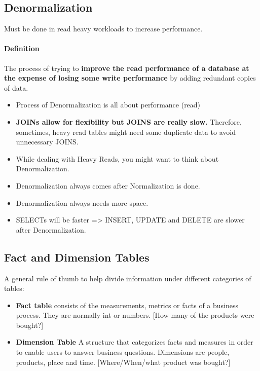\documentclass[
	paper=a4,%
	pagesize,%
	8pt, fleqn,%
	headings=small,%
	notitlepage,%
	parskip=never]%
	{scrreprt}
\begin{document}
\begin{multicols*}{3}
\section{Denormalization}
Must be done in read heavy workloads to increase performance.

\paragraph{Definition} The process of trying to \textbf{improve the read performance of a database at the expense of losing some write performance} by adding redundant copies of data. 

\begin{itemize}
\item Process of Denormalization is all about performance (read)
\item \textbf{JOINs allow for flexibility but JOINS are really slow.} Therefore, sometimes, heavy read tables might need some duplicate data to avoid unnecessary JOINS.
\item While dealing with Heavy Reads, you might want to think about Denormalization.
\item Denormalization always comes after Normalization is done.
\item Denormalization always needs more space.
\item SELECTs will be faster => INSERT, UPDATE and DELETE are slower after Denormalization.
\end{itemize}

\subsection{Fact and Dimension Tables}
A general rule of thumb to help divide information under different categories of tables:

\begin{itemize}
\item \textbf{Fact table} consists of the measurements, metrics or facts of a business process. They are normally int or numbers. [How many of the products were bought?]

\item \textbf{Dimension Table} A structure that categorizes facts and measures in order to enable users to answer business questions. Dimensions are people, products, place and time. [Where/When/what product was bought?]

\end{itemize}


\end{multicols*}
\end{document}
